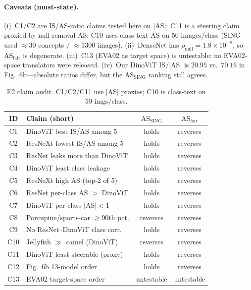 \documentclass[10pt,twocolumn]{article}
\begin{document}
\paragraph{Caveats (must-state).}
(i)~C1/C2 are IS/AS-ratio claims tested here on $|$AS$|$; C11 is a steering claim proxied by null-removal AS; C10 uses class-text AS on 50 images/class (SING used $\approx$30 concepts / $\approx$1300 images).
(ii)~DenseNet has $\rho_{\mathrm{null}}{=}1.8{\times}10^{-8}$, so $\mathrm{AS}_{\mathrm{fair}}$ is degenerate.
(iii)~C13 (EVA02 as target space) is untestable: no EVA02-space translators were released.
(iv)~Our DinoViT IS/$|$AS$|$ is $20.95$ vs.\ $70.16$ in Fig.~6b---absolute ratios differ, but the $\mathrm{AS}_{\mathrm{SING}}$ ranking still agrees.

\begin{table}[t]
\centering
\scriptsize
\setlength{\tabcolsep}{2.5pt}
\begin{tabular}{@{}clcc@{}}
\toprule
ID & Claim (short) & $\mathrm{AS}_{\mathrm{SING}}$ & $\mathrm{AS}_{\mathrm{fair}}$ \\
\midrule
C1 & DinoViT best IS/AS among 5 & holds & reverses \\
C2 & ResNeXt lowest IS/AS among 5 & holds & reverses \\
C3 & ResNet leaks more than DinoViT & holds & reverses \\
C4 & DinoViT least class leakage & holds & reverses \\
C5 & ResNeXt high AS (top-2 of 5) & holds & reverses \\
C6 & ResNet per-class AS $>$ DinoViT & holds & reverses \\
C7 & DinoViT per-class $|$AS$|{<}1$ & holds & reverses \\
C8 & Porcupine/sports-car $\ge$90th pct. & reverses & reverses \\
C9 & No ResNet--DinoViT class corr. & holds & reverses \\
C10 & Jellyfish $\gg$ camel (DinoViT) & reverses & reverses \\
C11 & DinoViT least steerable (proxy) & holds & reverses \\
C12 & Fig.~6b 13-model order & holds & reverses \\
C13 & EVA02 target-space order & untestable & untestable \\
\bottomrule
\end{tabular}
\vspace{-0.4em}
\caption{E2 claim audit. C1/C2/C11 use $|$AS$|$ proxies; C10 is class-text on 50 imgs/class.}
\label{tab:claims}
\vspace{-0.8em}
\end{table}
\end{document}

